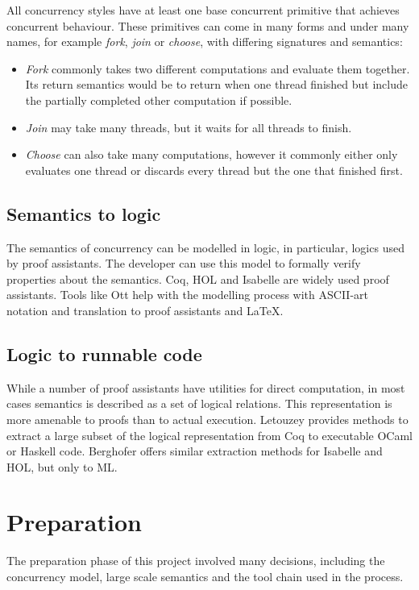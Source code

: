 \documentclass[12pt,twoside,notitlepage]{report}
\theoremstyle{plain}%
\theoremstyle{definition}
\theoremstyle{remark}
\begin{document}
All concurrency styles have at least one base concurrent primitive that achieves concurrent behaviour. These primitives can come in many forms and under many names, for example \textit{fork}, \textit{join} or \textit{choose}, with differing signatures and semantics:\label{sec:con_prims}
\begin{itemize}
\item{\textit{Fork} commonly takes two different computations and evaluate them together. Its return semantics would be to return when one thread finished but include the partially completed other computation if possible.}
\item{\textit{Join} may take many threads, but it waits for all threads to finish.}
\item{\textit{Choose} can also take many computations, however it commonly either only evaluates one thread or discards every thread but the one that finished first.}
\end{itemize}

\section{Semantics to logic}
The semantics of concurrency can be modelled in logic, in particular, logics used by proof assistants. The developer can use this model to formally verify properties about the semantics\cite{benton2008mechanized,blazy2009mechanized,blazy2006formal,leroy2009formal}. Coq\cite{Coq}, HOL and Isabelle are widely used proof assistants. Tools like Ott\cite{Ott} help with the modelling process with ASCII-art notation and translation to proof assistants and \LaTeX.


\section{Logic to runnable code}
While a number of proof assistants have utilities for direct computation, in most cases semantics is described as a set of logical relations. This representation is more amenable to proofs than to actual execution. Letouzey\cite{letouzey2008extraction} provides methods to extract a large subset of the logical representation from Coq to executable OCaml or Haskell code. Berghofer\cite{berghofer2003program} offers similar extraction methods for Isabelle and HOL, but only to ML.


\chapter{Preparation}
The preparation phase of this project involved many decisions, including the concurrency model, large scale semantics and the tool chain used in the process.
\end{document}
